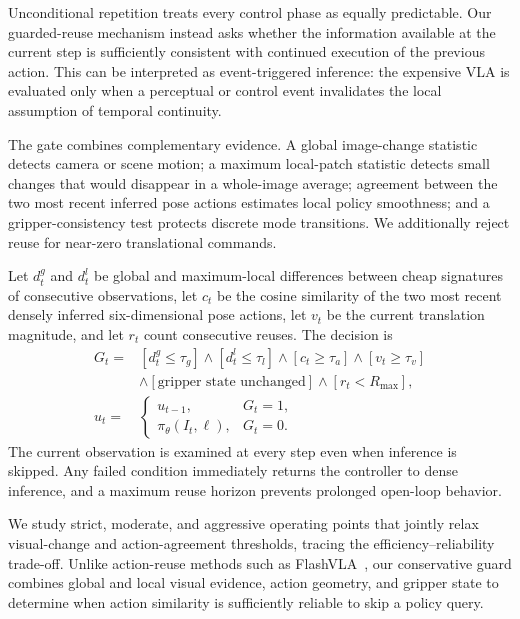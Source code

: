 \documentclass[letterpaper, 10 pt, conference]{ieeeconf}
\begin{document}
Unconditional repetition treats every control phase as equally predictable.
Our guarded-reuse mechanism instead asks whether the information available at
the current step is sufficiently consistent with continued execution of the
previous action. This can be interpreted as event-triggered inference: the
expensive VLA is evaluated only when a perceptual or control event invalidates
the local assumption of temporal continuity.

The gate combines complementary evidence. A global image-change statistic
detects camera or scene motion; a maximum local-patch statistic detects small
changes that would disappear in a whole-image average; agreement between the
two most recent inferred pose actions estimates local policy smoothness; and a
gripper-consistency test protects discrete mode transitions. We additionally
reject reuse for near-zero translational commands.

Let $d_t^g$ and $d_t^l$ be global and maximum-local differences between cheap
signatures of consecutive observations, let $c_t$ be the cosine similarity of
the two most recent densely inferred six-dimensional pose actions, let $v_t$
be the current translation magnitude, and let $r_t$ count consecutive reuses.
The decision is
\begin{equation}
\begin{aligned}
G_t ={}&
[d_t^g \le \tau_g] \wedge [d_t^l \le \tau_l]
\wedge [c_t \ge \tau_a] \wedge [v_t \ge \tau_v] \\
&\wedge [\text{gripper state unchanged}]
\wedge [r_t < R_{\max}], \\[2pt]
u_t ={}&
\begin{cases}
u_{t-1}, & G_t = 1,\\
\pi_\theta(I_t,\ell), & G_t = 0.
\end{cases}
\end{aligned}
\label{eq:guarded_reuse}
\end{equation}
The current observation is examined at every step even when inference is
skipped. Any failed condition immediately returns the controller to dense
inference, and a maximum reuse horizon prevents prolonged open-loop behavior.

We study strict, moderate, and aggressive operating points that jointly relax visual-change and action-agreement thresholds, tracing the efficiency–reliability trade-off. Unlike action-reuse methods such as FlashVLA~\cite{flashvla}, our conservative guard combines global and local visual evidence, action geometry, and gripper state to determine when action similarity is sufficiently reliable to skip a policy query.
\end{document}
